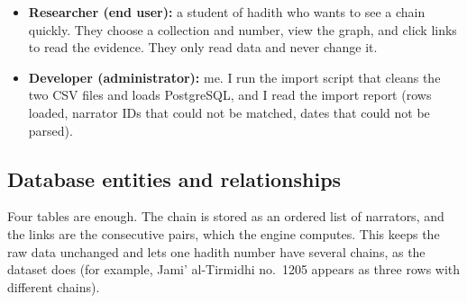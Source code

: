 \documentclass[11pt,a4paper]{article}
\begin{document}
\begin{itemize}
  \item \textbf{Researcher (end user):} a student of hadith who wants to see a chain quickly. They choose a collection and number, view the graph, and click links to read the evidence. They only read data and never change it.
  \item \textbf{Developer (administrator):} me. I run the import script that cleans the two CSV files and loads PostgreSQL, and I read the import report (rows loaded, narrator IDs that could not be matched, dates that could not be parsed).
\end{itemize}

\subsection{Database entities and relationships}
Four tables are enough. The chain is stored as an ordered list of narrators, and the links are the consecutive pairs, which the engine computes. This keeps the raw data unchanged and lets one hadith number have several chains, as the dataset does (for example, Jami' al-Tirmidhi no.~1205 appears as three rows with different chains).
\end{document}
